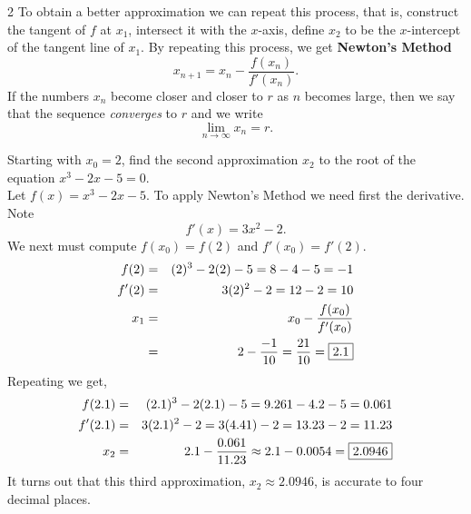 \documentclass{book}
\begin{document}
\begin{multicols}{2}
To obtain a better approximation we can repeat this process, that is, construct the tangent of $f$ at $x_1$, intersect it with the $x$-axis, define $x_2$ to be the $x$-intercept of the tangent line of $x_1$. By repeating this process, we get \textbf{Newton's Method} \begin{equation} x_{n+1} = x_n - \dfrac{f(x_n)}{f'(x_n)}.\end{equation} If the numbers $x_n$ become closer and closer to $r$ as $n$ becomes large, then we say that the sequence \emph{converges} to $r$ and we write \[\lim_{n\to \infty} x_n = r.\]\vfill
\begin{center}
\end{center}
\end{multicols}

\begin{Exam} Starting with $x_0=2$, find the second approximation $x_2$ to the root of the equation $x^3-2x-5=0$.\\

Let $f(x) = x^3-2x-5$. To apply Newton's Method we need first the derivative. Note \[f'(x) = 3x^2-2.\] We next must compute $f(x_0) = f(2)$ and $f'(x_0) = f'(2)$. 
\begin{eqnarray*}
f(2) &=& (2)^3-2(2)-5 = 8-4-5 = -1\\
f'(2) &=& 3(2)^2 - 2 = 12-2 = 10\\
x_1 &=& x_0 - \dfrac{f(x_0)}{f'(x_0)}\\
&=& 2 - \dfrac{-1}{10} = \dfrac{21}{10} = \fbox{$2.1$}
\end{eqnarray*} Repeating we get, 
\begin{eqnarray*}
f(2.1) &=& (2.1)^3-2(2.1)-5 = 9.261 - 4.2 - 5 = 0.061\\
f'(2.1) &=& 3(2.1)^2 - 2 = 3(4.41)-2 = 13.23 - 2 = 11.23\\
x_2 &=& 2.1 - \dfrac{0.061}{11.23} \approx 2.1 - 0.0054 = \fbox{$2.0946$}
\end{eqnarray*} It turns out that this third approximation, $x_2 \approx 2.0946$,  is accurate to four decimal places. 
\end{Exam}\vs
\end{document}
